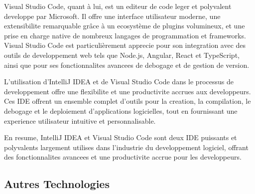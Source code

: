 \documentclass[a4paper, 11pt, openany]{report}
\begin{document}
Visual Studio Code, quant à lui, est un editeur de code leger et polyvalent developpe par Microsoft. Il offre une interface utilisateur moderne, une extensibilite remarquable grâce à un ecosystème de plugins volumineux, et une prise en charge native de nombreux langages de programmation et frameworks. Visual Studio Code est particulièrement apprecie pour son integration avec des outils de developpement web tels que Node.js, Angular, React et TypeScript, ainsi que pour ses fonctionnalites avancees de debogage et de gestion de version.

L'utilisation d'IntelliJ IDEA et de Visual Studio Code dans le processus de developpement offre une flexibilite et une productivite accrues aux developpeurs. Ces IDE offrent un ensemble complet d'outils pour la creation, la compilation, le debogage et le deploiement d'applications logicielles, tout en fournissant une experience utilisateur intuitive et personnalisable.

En resume, IntelliJ IDEA et Visual Studio Code sont deux IDE puissants et polyvalents largement utilises dans l'industrie du developpement logiciel, offrant des fonctionnalites avancees et une productivite accrue pour les developpeurs.


\subsection{Autres Technologies}
\end{document}
